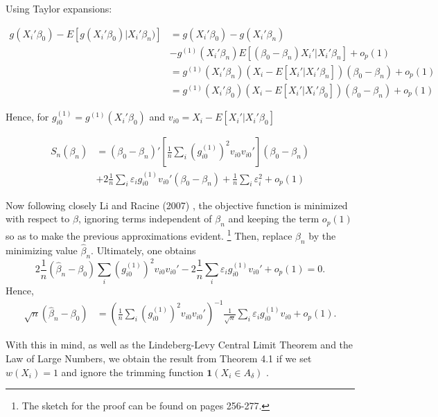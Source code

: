 Using Taylor expansions:

\begin{align*}
g(X_i'\beta_0) - E[g(X_i'\beta_0)|X_i'\beta_n)] & = g(X_i'\beta_0) - g(X_i'\beta_n) \\
                                             & - g^{(1)}(X_i'\beta_n)E[(\beta_0 - \beta_n)X_i'|X_i'\beta_n] + o_p(1) \\
                                              & = g^{(1)}(X_i'\beta_n)( X_i - E[X_i'|X_i'\beta_n])(\beta_0 - \beta_n) + o_p(1) \\
                                              & = g^{(1)}(X_i'\beta_0)( X_i - E[X_i'|X_i'\beta_0])(\beta_0 - \beta_n) + o_p(1)
\end{align*}


Hence, for $g_{i0}^{(1)} = g^{(1)}(X_i'\beta_0)$ and $v_{i0} = X_i - E[X_i'|X_i'\beta_0]$
 
\begin{align*}
S_{n}(\beta_n) & = (\beta_0 - \beta_n)'\left[\frac{1}{n}\sum_i (g_{i0}^{(1)})^2v_{i0}v_{i0}'\right](\beta_0 - \beta_n) \\
             & + 2\frac{1}{n}\sum_i\varepsilon_ig_{i0}^{(1)}v_{i0}'(\beta_0 - \beta_n) + \frac{1}{n}\sum_i \varepsilon_i^2 + o_p(1)
\end{align*}

Now following closely Li and Racine (2007) \cite{[1]}, the objective function is minimized with respect to $\beta$, ignoring terms independent of $\beta_n$ and keeping the term $o_p(1)$ so as to make the previous approximations evident. \footnote{ The sketch for the proof can be found on pages 256-277.} Then, replace $\beta_n$ by the minimizing value $\hat{\beta}_n$. Ultimately, one obtains
\[2\frac{1}{n}(\hat{\beta}_n - \beta_0)\sum_i(g_{i0}^{(1)})^2v_{i0}v_{i0}' - 2\frac{1}{n}\sum_i\varepsilon_ig_{i0}^{(1)}v_{i0}' + o_p(1) = 0.  \]
Hence, 
\begin{align*}
\sqrt{n}(\hat{\beta}_n - \beta_0) & = (\frac{1}{n}\sum_i(g_{i0}^{(1)})^2v_{i0}v_{i0}')^{-1}\frac{1}{\sqrt{n}}\sum_i\varepsilon_i g_{i0}^{(1)}v_{i0} + o_p(1).
\end{align*}

With this in mind, as well as the Lindeberg-Levy Central Limit Theorem and the Law of Large Numbers, we obtain the result from Theorem 4.1 if we set $w(X_i) = 1$ and ignore the trimming function $\mathbf{1}(X_i \in A_\delta)$ .




